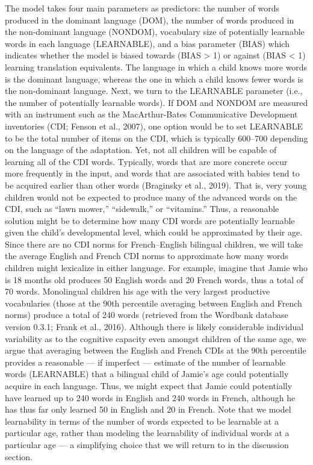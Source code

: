\documentclass[
  english,
  ,man,floatsintext]{apa6}
\begin{document}
The model takes four main parameters as predictors: the number of words produced in the dominant language (DOM), the number of words produced in the non-dominant language (NONDOM), vocabulary size of potentially learnable words in each language (LEARNABLE), and a bias parameter (BIAS) which indicates whether the model is biased towards (BIAS \textgreater{} 1) or against (BIAS \textless{} 1) learning translation equivalents. The language in which a child knows more words is the dominant language, whereas the one in which a child knows fewer words is the non-dominant language. Next, we turn to the LEARNABLE parameter (i.e., the number of potentially learnable words). If DOM and NONDOM are measured with an instrument such as the MacArthur-Bates Communicative Development inventories (CDI; Fenson et al., 2007), one option would be to set LEARNABLE to be the total number of items on the CDI, which is typically 600--700 depending on the language of the adaptation. Yet, not all children will be capable of learning all of the CDI words. Typically, words that are more concrete occur more frequently in the input, and words that are associated with babies tend to be acquired earlier than other words (Braginsky et al., 2019). That is, very young children would not be expected to produce many of the advanced words on the CDI, such as ``lawn mower,'' ``sidewalk,'' or ``vitamins.'' Thus, a reasonable solution might be to determine how many CDI words are potentially learnable given the child's developmental level, which could be approximated by their age. Since there are no CDI norms for French--English bilingual children, we will take the average English and French CDI norms to approximate how many words children might lexicalize in either language. For example, imagine that Jamie who is 18 months old produces 50 English words and 20 French words, thus a total of 70 words. Monolingual children his age with the very largest productive vocabularies (those at the 90th percentile averaging between English and French norms) produce a total of 240 words (retrieved from the Wordbank database version 0.3.1; Frank et al., 2016). Although there is likely considerable individual variability as to the cognitive capacity even amongst children of the same age, we argue that averaging between the English and French CDIs at the 90th percentile provides a reasonable --- if imperfect --- estimate of the number of learnable words (LEARNABLE) that a bilingual child of Jamie's age could potentially acquire in each language. Thus, we might expect that Jamie could potentially have learned up to 240 words in English and 240 words in French, although he has thus far only learned 50 in English and 20 in French. Note that we model learnability in terms of the number of words expected to be learnable at a particular age, rather than modeling the learnability of individual words at a particular age --- a simplifying choice that we will return to in the discussion section.
\end{document}
